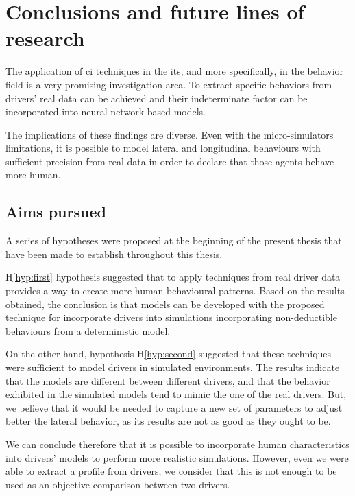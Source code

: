 \chapter{Conclusions and future lines of research}
\label{ch:conclusions-eng}

The application of \acrlong{ci} techniques in the \acrshort{its}, and more specifically, in the behavior field is a very promising investigation area. To extract specific behaviors from drivers’ real data can be achieved and their indeterminate factor can be incorporated into neural network based models.

The implications of these findings are diverse. Even with the micro-simulators limitations, it is possible to model lateral and longitudinal behaviours with sufficient precision from real data in order to declare that those agents behave more human.

\section{Aims pursued}

A series of hypotheses were proposed at the beginning of the present thesis that have been made to establish throughout this thesis.

H\ref{hyp:first} hypothesis suggested that to apply  techniques from real driver data provides a way to create more human behavioural patterns. Based on the results obtained, the conclusion is that models can be developed with the proposed technique for incorporate drivers into simulations incorporating non-deductible behaviours from a deterministic model.

On the other hand, hypothesis H\ref{hyp:second} suggested that these techniques were sufficient to model drivers in simulated environments. The results indicate that the models are different between different drivers, and that the behavior exhibited in the simulated models tend to mimic the one of the real drivers. But, we believe that it would be needed to capture a new set of parameters to adjust better the lateral behavior, as its results are not as good as they ought to be.

We can conclude therefore that it is possible to incorporate human characteristics into drivers’ models to perform more realistic simulations. However, even we were able to extract a profile from drivers, we consider that this is not enough to be used as an objective comparison between two drivers.

